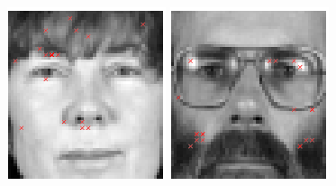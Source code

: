 \begin{figure}
\begin{center}
\includegraphics[width=\textwidth/9]{ch4/figures/NoC7.png}
\includegraphics[width=\textwidth/9]{ch4/figures/NoC8.png}\\

\end{center}
\end{figure}
